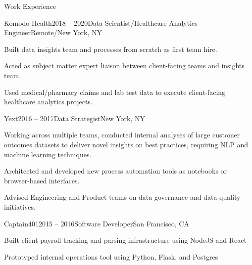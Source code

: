 \documentclass{resume} %
\begin{document}




\begin{rSection}{Work Experience}
\begin{rSubsection}{Komodo Health}{2018 -- 2020}{Data Scientist/Healthcare Analytics Engineer}{Remote/New York, NY}
\item Built data insights team and processes from scratch as first team hire.
\item Acted as subject matter expert liaison between client-facing teams and insights team.
\item Used medical/pharmacy claims and lab test data to execute client-facing healthcare analytics projects.

\end{rSubsection}
\begin{rSubsection}{Yext}{2016 -- 2017}{Data Strategist}{New York, NY}
\item Working across multiple teams, conducted internal analyses of large customer outcomes datasets to deliver novel insights on best practices, requiring NLP and machine learning techniques.
\item Architected and developed new process automation tools as notebooks or browser-based interfaces.
\item Advised Engineering and Product teams on data governance and data quality initiatives.

\end{rSubsection}

\begin{rSubsection}{Captain401}{2015 -- 2016}{Software Developer}{San Francisco, CA}
\item Built client payroll tracking and parsing infrastructure using NodeJS and React
\item Prototyped internal operations tool using Python, Flask, and Postgres

\end{rSubsection}



\end{rSection}
\end{document}
